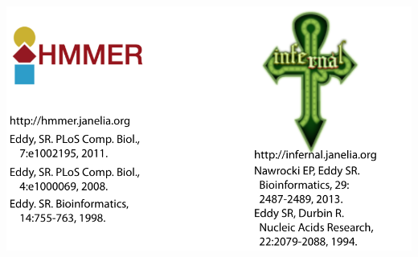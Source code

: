 \documentclass[landscape]{slides}
\begin{document}
\begin{slide}
\begin{center}
\hspace{2.2in}\includegraphics[height=3.5in]{figs/hmmer-infernal-refs-2015}

\end{center}

\vfill

\end{slide}

\end{document}
